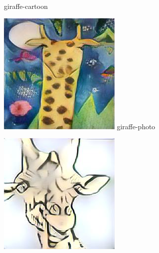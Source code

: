 \documentclass{article}
\begin{document}
\begin{figure}[htp]
\begin{minipage}{0.14285714285714285\linewidth}
        {giraffe-cartoon}
    \end{minipage}%
    \begin{minipage}{0.14285714285714285\linewidth}
        \includegraphics[width=\linewidth]{./classify/derived-files/giraffe_photo_0.jpg}
        {giraffe-photo}
    \end{minipage}%
    \begin{minipage}{0.14285714285714285\linewidth}
        \includegraphics[width=\linewidth]{./classify/derived-files/giraffe_sketch_0.jpg}

\end{minipage}
\end{figure}
\end{document}
